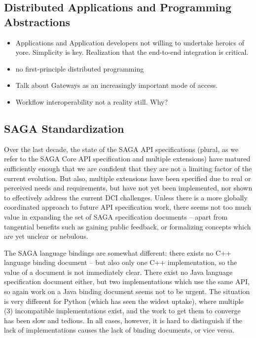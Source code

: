\documentclass{article}
\begin{document}
   
\subsection{Distributed Applications and Programming Abstractions}

 \begin{itemize}
 \item Applications and Application developers not willing to
   undertake heroics of yore. Simplicity is key. Realization that the
   end-to-end integration is critical.
 \item no first-principle distributed programming
 \item Talk about Gateways as an increasingly important mode of
   access. 
 \item Workflow interoperability not a reality still. Why?
 \end{itemize}

 \subsection{SAGA Standardization}

  Over the last decade, the state of the SAGA API specifications
  (plural, as we refer to the SAGA Core API specification and multiple
  extensions) have matured sufficiently enough that we are confident
  that they are not a limiting factor of the current evolution.  But
  also, multiple extensions have been specified due to real or perceived
  needs and requirements, but have not yet been implemented, nor shown
  to effectively address the current DCI challenges.  Unless there is
  a more globally coordinated approach to future API specification work,
  there seems not too much value in expanding the set of SAGA
  specification documents -- apart from tangential benefits such as
  gaining public feedback, or formalizing concepts which are yet unclear
  or nebulous.

  The SAGA language bindings are somewhat different: there exists no C++
  language binding document -- but also only one C++ implementation, so
  the value of a document is not immediately clear.  There exist no Java
  language specification document either, but two implementations which
  use the same API, so again work on a Java binding document seems not
  to be urgent.  The situation is very different for Python (which has
  seen the widest uptake), where multiple (3) incompatible
  implementations exist, and the work to get them to converge has been
  slow and tedious.  In all cases, however, it is hard to distinguish if
  the lack of implementations causes the lack of binding documents, or
  vice versa.
  
\end{document}
